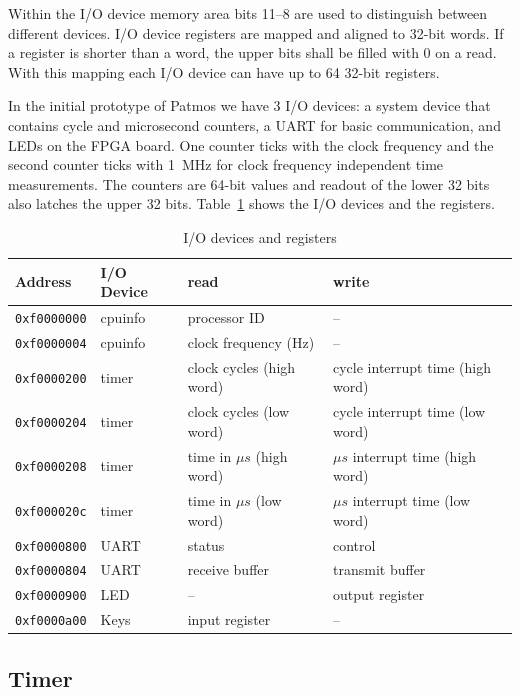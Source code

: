 \documentclass[a4paper,fontsize=10pt,twoside,DIV15,BCOR12mm,headinclude=true,footinclude=false,pagesize,bibtotoc]{scrbook}
\newcommand{\code}[1]{{\texttt{#1}}}
\begin{document}
Within the I/O device memory area bits 11--8 are used to distinguish between different devices.
I/O device registers are mapped and aligned to 32-bit words. If a register is shorter than a word,
the upper bits shall be filled with 0 on a read. With this mapping each I/O device can have up to
64 32-bit registers.

In the initial prototype of Patmos we have 3 I/O devices: a system device that contains cycle and microsecond counters, a UART for basic communication, and LEDs
on the FPGA board. One counter ticks with the clock frequency and the second
counter ticks with 1~MHz for clock frequency independent time measurements.
The counters are 64-bit values and readout of the lower 32 bits also latches the
upper 32 bits.
Table~\ref{tab:iomap} shows the I/O devices and the registers.

\begin{table}
\centering
\begin{tabular}{llll}
\toprule
Address & I/O Device & read & write \\
\midrule
\code{0xf0000000} & cpuinfo & processor ID & -- \\
\code{0xf0000004} & cpuinfo & clock frequency (Hz) & -- \\
\code{0xf0000200} & timer & clock cycles (high word) & cycle interrupt time (high word) \\
\code{0xf0000204} & timer & clock cycles (low word) & cycle interrupt time (low word) \\
\code{0xf0000208} & timer & time in $\mu s$ (high word) & $\mu s$ interrupt time (high word) \\
\code{0xf000020c} & timer & time in $\mu s$ (low word) &  $\mu s$ interrupt time (low word) \\
\code{0xf0000800} & UART & status & control \\
\code{0xf0000804} & UART & receive buffer & transmit buffer \\
\code{0xf0000900} & LED & -- & output register \\
\code{0xf0000a00} & Keys & input register & -- \\
\bottomrule
\end{tabular}
\caption{I/O devices and registers}
\label{tab:iomap}
\end{table}

\subsection{Timer}
\end{document}
